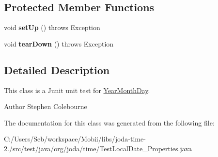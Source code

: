 \subsection*{Protected Member Functions}
\begin{DoxyCompactItemize}
\item 
\hypertarget{classorg_1_1joda_1_1time_1_1_test_local_date___properties_a7c953e76812225e33d376e3198311f15}{void {\bfseries set\-Up} ()  throws Exception }\label{classorg_1_1joda_1_1time_1_1_test_local_date___properties_a7c953e76812225e33d376e3198311f15}

\item 
\hypertarget{classorg_1_1joda_1_1time_1_1_test_local_date___properties_a39d1f72289f034c80538c22f8149747c}{void {\bfseries tear\-Down} ()  throws Exception }\label{classorg_1_1joda_1_1time_1_1_test_local_date___properties_a39d1f72289f034c80538c22f8149747c}

\end{DoxyCompactItemize}


\subsection{Detailed Description}
This class is a Junit unit test for \hyperlink{classorg_1_1joda_1_1time_1_1_year_month_day}{Year\-Month\-Day}.

\begin{DoxyAuthor}{Author}
Stephen Colebourne 
\end{DoxyAuthor}


The documentation for this class was generated from the following file\-:\begin{DoxyCompactItemize}
\item 
C\-:/\-Users/\-Seb/workspace/\-Mobii/libs/joda-\/time-\/2./src/test/java/org/joda/time/Test\-Local\-Date\-\_\-\-Properties.\-java\end{DoxyCompactItemize}

